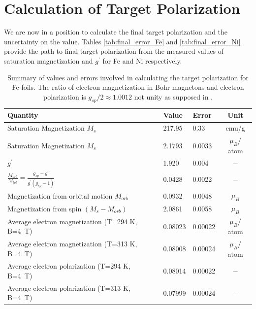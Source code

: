 \documentclass[12pt]{article}
\begin{document}
\section{Calculation of Target Polarization}\label{sec:final_calc}
We are now in a position to calculate the final target polarization and the uncertainty on the value. Tables \ref{tab:final_error_Fe} and \ref{tab:final_error_Ni} provide the path to final target polarization from the measured values of saturation magnetization and $g^{\prime}$ for Fe and Ni respectively. 
\begin{table}[h]
\begin{center}
\begin{tabular}{|l|l|l|c|}\hline
Quantity&Value&Error&Unit\\\hline
Saturation Magnetization $M_s$&217.95&0.33&emu/g\\
Saturation Magnetization $M_s$&2.1793&0.0033&$\mu_B/$atom\\
$g^{\prime}$&1.920&0.004&$-$\\
$\frac{M_{orb}}{M_{tot}}=\frac{g_{sp}-g^{\prime}}{g^{\prime}(g_{sp}-1)}$&0.0428&0.0022&$-$\\
Magnetization from orbital motion $M_{orb}$&0.0932&0.0048&$\mu_B$\\
Magnetization from spin $(M_s-M_{orb})$&2.0861&0.0058&$\mu_B$\\
Average electron magnetization (T=294 K, B=4~T)&0.08023&0.00022&$\mu_B/$atom\\
Average electron magnetization (T=313 K, B=4~T)&0.08008&0.00024&$\mu_B/$atom\\
Average electron polarization (T=294 K, B=4~T)&0.08014&0.00022&$-$\\
Average electron polarization (T=313 K, B=4~T)&0.07999&0.00024&$-$\\\hline
\end{tabular}
\end{center}
\caption{\label{tab:final_errors_Fe}Summary of values and errors involved in calculating the target polarization for Fe foils. The ratio of electron magnetization in Bohr magnetons and electron polarization is $g_{sp}/2\approx1.0012$ not unity as supposed in \cite{deBever1997}.}
\end{table}
\end{document}
